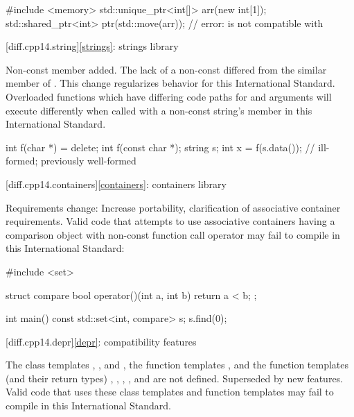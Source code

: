 \begin{codeblock}
#include <memory>
std::unique_ptr<int[]> arr(new int[1]);
std::shared_ptr<int> ptr(std::move(arr)); // error:  is not compatible with 
\end{codeblock}

[diff.cpp14.string]{\ref{strings}: strings library}

\change Non-const  member added.
\rationale The lack of a non-const 
differed from the similar member of .
This change regularizes behavior for this International Standard.
\effect
Overloaded functions which have differing code paths
for  and  arguments
will execute differently
when called with a non-const string's  member
in this International Standard.

\begin{codeblock}
int f(char *) = delete;
int f(const char *);
string s;
int x = f(s.data()); // ill-formed; previously well-formed
\end{codeblock}

[diff.cpp14.containers]{\ref{containers}: containers library}

\change Requirements change:
\rationale Increase portability, clarification of associative container requirements.
\effect
Valid \CppXIV{} code that attempts to use associative containers
having a comparison object with non-const function call operator
may fail to compile in this International Standard:

\begin{codeblock}
#include <set>

struct compare
{
  bool operator()(int a, int b)
  {
    return a < b;
  }
};

int main() {
  const std::set<int, compare> s;
  s.find(0);
}
\end{codeblock}

[diff.cpp14.depr]{\ref{depr}: compatibility features}

\nodiffref
\change
The class templates
,
, and
,
the function templates
,
and the function templates (and their return types)
,
,
,
, and
are not defined.
\rationale Superseded by new features.
\effect Valid \CppXIV{} code that uses these class templates
and function templates may fail to compile in this International Standard.

